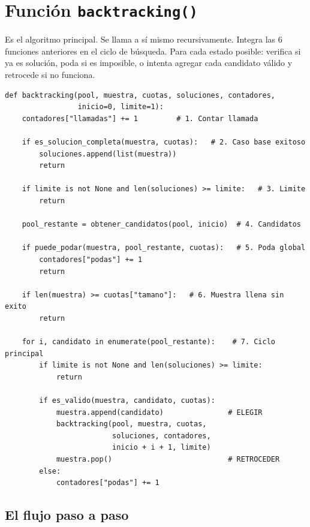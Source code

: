 \documentclass[11pt, a4paper]{article}
\begin{document}
\section{Función \texttt{backtracking()}}

\begin{quehaec}
Es el algoritmo principal. Se llama a sí mismo recursivamente. Integra las 6 funciones anteriores en el ciclo de búsqueda. Para cada estado posible: verifica si ya es solución, poda si es imposible, o intenta agregar cada candidato válido y retrocede si no funciona.
\end{quehaec}

\begin{lstlisting}[style=python]
def backtracking(pool, muestra, cuotas, soluciones, contadores,
                 inicio=0, limite=1):
    contadores["llamadas"] += 1         # 1. Contar llamada

    if es_solucion_completa(muestra, cuotas):   # 2. Caso base exitoso
        soluciones.append(list(muestra))
        return

    if limite is not None and len(soluciones) >= limite:   # 3. Limite
        return

    pool_restante = obtener_candidatos(pool, inicio)  # 4. Candidatos

    if puede_podar(muestra, pool_restante, cuotas):   # 5. Poda global
        contadores["podas"] += 1
        return

    if len(muestra) >= cuotas["tamano"]:   # 6. Muestra llena sin exito
        return

    for i, candidato in enumerate(pool_restante):    # 7. Ciclo principal
        if limite is not None and len(soluciones) >= limite:
            return

        if es_valido(muestra, candidato, cuotas):
            muestra.append(candidato)               # ELEGIR
            backtracking(pool, muestra, cuotas,
                         soluciones, contadores,
                         inicio + i + 1, limite)
            muestra.pop()                           # RETROCEDER
        else:
            contadores["podas"] += 1
\end{lstlisting}

\subsection{El flujo paso a paso}
\end{document}
